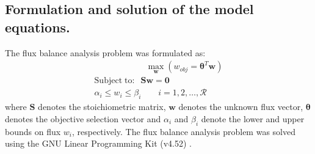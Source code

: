\documentclass[journal=asbcd6,manuscript=article]{achemso}
\begin{document}
\subsection*{Formulation and solution of the model equations.}
The flux balance analysis problem was formulated as:
\begin{equation}\nonumber
 \begin{multlined}
	\qquad \qquad \qquad \max_{\boldsymbol{w}}{} \! \left( w_{obj} = \mathbf{\boldsymbol{\theta}}^T \boldsymbol{w} \right) \\
	\mathrm{Subject \; to:}
	 \; \; \mathbf{S}\mathbf{w}=\mathbf{0} \\
\alpha_i \leq w_i \leq \beta_i  \qquad i=1,2,\hdots,\mathcal{R}
 \end{multlined}
\end{equation}
where $\mathbf{S}$ denotes the stoichiometric matrix, $\mathbf{w}$ denotes the unknown flux vector, $\boldsymbol{\theta}$ denotes the objective selection vector
and $\alpha_i$ and $\beta_i$ denote the lower and upper bounds on flux $w_{i}$, respectively.
The flux balance analysis problem was solved using the GNU Linear Programming Kit (v4.52) \cite{GLPK}.
\end{document}
